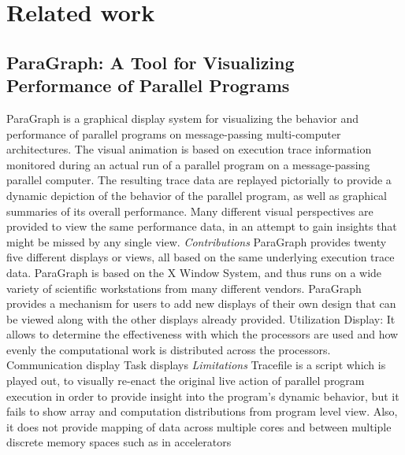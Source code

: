 \section{Related work}
\subsection{ParaGraph: A Tool for Visualizing Performance of Parallel Programs}
ParaGraph is a graphical display system for visualizing the behavior and performance of parallel programs on message-passing multi-computer architectures. The visual animation is based on execution trace information monitored during an actual run of a parallel program on a message-passing parallel computer. The resulting trace data are replayed pictorially to provide a dynamic depiction of the behavior of the parallel program, as well as graphical summaries of its overall performance. Many different visual perspectives are provided to view the same performance data, in an attempt to gain insights that might be missed by any single view.\newline
\textit{Contributions}\newline
ParaGraph provides twenty five different displays or views, all based on the same underlying execution trace data.
ParaGraph is based on the X Window System, and thus runs on a wide variety of scientific workstations from many different vendors.
ParaGraph provides a mechanism for users to add new displays of their own design that can be viewed along with the other displays already provided.
Utilization Display: It allows to determine the effectiveness with which the processors are used and how evenly the computational work is distributed across the processors.
Communication display
Task displays \newline
\textit{Limitations}\newline
Tracefile is a script which is played out, to visually re-enact the original live action of parallel program execution in order to provide insight into the program's dynamic behavior, but it fails to show array and computation distributions from program level view. Also, it does not provide mapping of data across multiple cores and between multiple discrete memory spaces such as in accelerators

